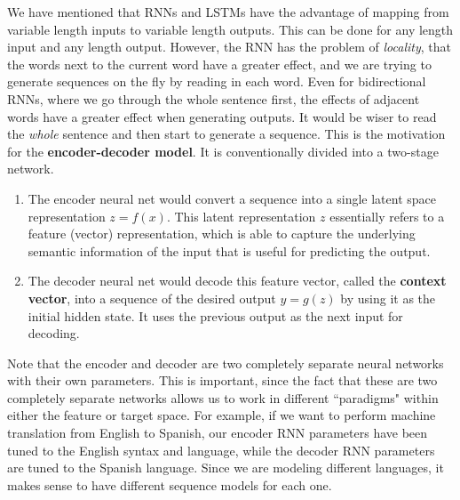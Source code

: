 \documentclass{article}
\begin{document}
  We have mentioned that RNNs and LSTMs have the advantage of mapping from variable length inputs to variable length outputs. This can be done for any length input and any length output. However, the RNN has the problem of \textit{locality}, that the words next to the current word have a greater effect, and we are trying to generate sequences on the fly by reading in each word. Even for bidirectional RNNs, where we go through the whole sentence first, the effects of adjacent words have a greater effect when generating outputs. It would be wiser to read the \textit{whole} sentence and then start to generate a sequence. This is the motivation for the \textbf{encoder-decoder model}. It is conventionally divided into a two-stage network. 
  \begin{enumerate}
    \item The encoder neural net would convert a sequence into a single latent space representation $z = f(x)$. This latent representation $z$ essentially refers to a feature (vector) representation, which is able to capture the underlying semantic information of the input that is useful for predicting the output. 
    \item The decoder neural net would decode this feature vector, called the \textbf{context vector}, into a sequence of the desired output $y = g(z)$ by using it as the initial hidden state. It uses the previous output as the next input for decoding. 
  \end{enumerate}
  Note that the encoder and decoder are two completely separate neural networks with their own parameters. This is important, since the fact that these are two completely separate networks allows us to work in different ``paradigms" within either the feature or target space. For example, if we want to perform machine translation from English to Spanish, our encoder RNN parameters have been tuned to the English syntax and language, while the decoder RNN parameters are tuned to the Spanish language. Since we are modeling different languages, it makes sense to have different sequence models for each one. 
\end{document}
